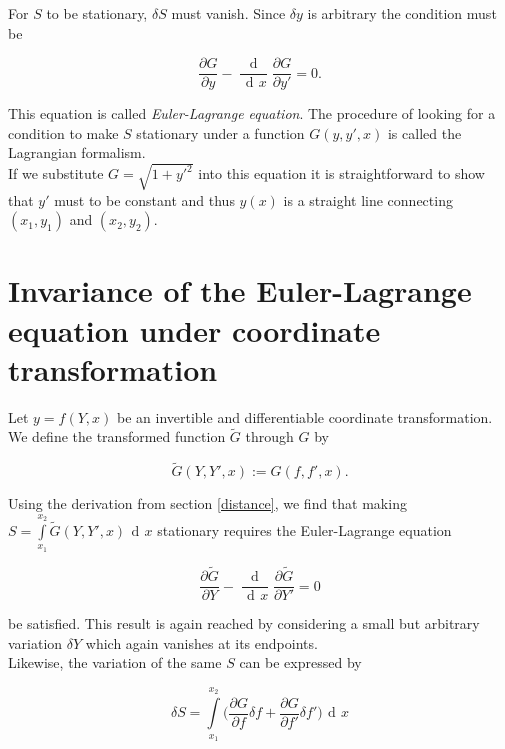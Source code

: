 \documentclass{article}
\DeclareMathOperator{\dd}{\!d\!}
\begin{document}
For $S$ to be stationary, $\delta S$ must vanish. Since $\delta y$ is arbitrary the condition must be


\begin{equation}
\frac{\partial G}{\partial y} - \frac{\dd}{\dd x}\frac{\partial G}{\partial y'} = 0.
\end{equation}

This equation is called \emph{Euler-Lagrange equation}. The procedure of looking for a condition to make $S$ stationary under a function $G(y,y',x)$ is called the Lagrangian formalism.\\

If we substitute $G = \sqrt{1+y'^2}$ into this equation it is straightforward to show that $y'$ must to be constant and thus $y(x)$ is a straight line connecting $(x_1,y_1)$ and $(x_2,y_2)$. %

\section{Invariance of the Euler-Lagrange equation under coordinate transformation \cite{Kleinert}}

Let $y=f(Y,x)$ be an invertible and differentiable coordinate transformation. We define the transformed function $\widetilde{G}$ through $G$ by

\begin{equation}
\widetilde{G}(Y,Y',x) := G(f,f',x).
\end{equation}

Using the derivation from section \ref{distance}, we find that making $S = \int\limits_{x_1}^{x_2} \widetilde{G}(Y,Y',x) \dd x$ stationary requires the Euler-Lagrange equation

\begin{equation}
\frac{\partial \widetilde{G}}{\partial Y} 
- \frac{\dd}{\dd x}\frac{\partial \widetilde{G}}{\partial Y'} = 0
\end{equation}

be satisfied. This result is again reached by considering a small but arbitrary variation $\delta Y$ which again vanishes at its endpoints.\\

Likewise, the variation of the same $S$ can be expressed by

\begin{equation}
\delta S = \int\limits_{x_1}^{x_2} \bigg( \frac{\partial G}{\partial f} \delta f 
+ \frac{\partial G}{\partial f'} \delta f' \bigg) \dd x
\end{equation}
\end{document}
